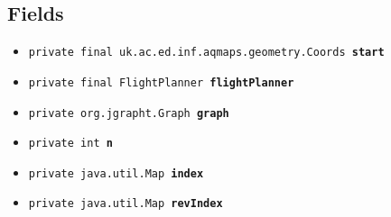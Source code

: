 \documentclass[11pt,a4paper]{report}
\begin{document}
{{{{{{{{{{{\subsection{Fields}{
\begin{itemize}
\item{
\label{uk.ac.ed.inf.aqmaps.flightplanning.EnhancedTwoOptTSP.start}\hypertarget{uk.ac.ed.inf.aqmaps.flightplanning.EnhancedTwoOptTSP.start}{\texttt{private final uk.ac.ed.inf.aqmaps.geometry.Coords\ {\bf  start}}
}
}
\item{
\label{uk.ac.ed.inf.aqmaps.flightplanning.EnhancedTwoOptTSP.flightPlanner}\hypertarget{uk.ac.ed.inf.aqmaps.flightplanning.EnhancedTwoOptTSP.flightPlanner}{\texttt{private final FlightPlanner\ {\bf  flightPlanner}}
}
}
\item{
\label{uk.ac.ed.inf.aqmaps.flightplanning.EnhancedTwoOptTSP.graph}\hypertarget{uk.ac.ed.inf.aqmaps.flightplanning.EnhancedTwoOptTSP.graph}{\texttt{private org.jgrapht.Graph\ {\bf  graph}}
}
}
\item{
\label{uk.ac.ed.inf.aqmaps.flightplanning.EnhancedTwoOptTSP.n}\hypertarget{uk.ac.ed.inf.aqmaps.flightplanning.EnhancedTwoOptTSP.n}{\texttt{private int\ {\bf  n}}
}
}
\item{
\label{uk.ac.ed.inf.aqmaps.flightplanning.EnhancedTwoOptTSP.index}\hypertarget{uk.ac.ed.inf.aqmaps.flightplanning.EnhancedTwoOptTSP.index}{\texttt{private java.util.Map\ {\bf  index}}
}
}
\item{
\label{uk.ac.ed.inf.aqmaps.flightplanning.EnhancedTwoOptTSP.revIndex}\hypertarget{uk.ac.ed.inf.aqmaps.flightplanning.EnhancedTwoOptTSP.revIndex}{\texttt{private java.util.Map\ {\bf  revIndex}}
}
}
\end{itemize}
}
}}}}}}}}}}}
\end{document}
